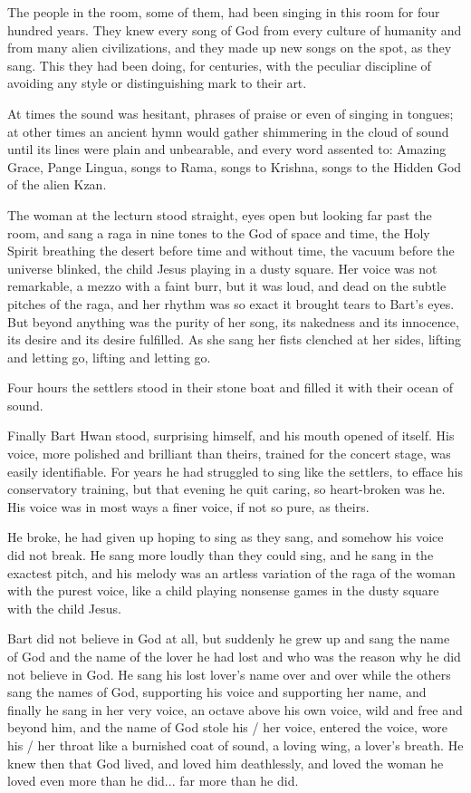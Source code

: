 \documentclass[english,11pt,letterpaper,onecolumn]{scrbook}
\begin{document}
	The people in the room, some of them, had been singing in this room for four hundred years. They knew every song of God from every culture of humanity and from many alien civilizations, and they made up new songs on the spot, as they sang. This they had been doing, for centuries, with the peculiar discipline of avoiding any style or distinguishing mark to their art. 

	At times the sound was hesitant, phrases of praise or even of singing in tongues; at other times an ancient hymn would gather shimmering in the cloud of sound until its lines were plain and unbearable, and every word assented to: Amazing Grace, Pange Lingua, songs to Rama, songs to Krishna, songs to the Hidden God of the alien Kzan. 

	The woman at the lecturn stood straight, eyes open but looking far past the room, and sang a raga in nine tones to the God of space and time, the Holy Spirit breathing the desert before time and without time, the vacuum before the universe blinked, the child Jesus playing in a dusty square.  Her voice was not remarkable, a mezzo with a faint burr, but it was loud, and dead on the subtle pitches of the raga, and her rhythm was so exact it brought tears to Bart's eyes.  But beyond anything was the purity of her song, its nakedness and its innocence, its desire and its desire fulfilled. As she sang her fists clenched at her sides, lifting and letting go, lifting and letting go.

	Four hours the settlers stood in their stone boat and filled it with their ocean of sound.

	Finally Bart Hwan stood, surprising himself, and his mouth opened of itself. His voice, more polished and brilliant than theirs, trained for the concert stage, was easily identifiable. For years he had struggled to sing like the settlers, to efface his conservatory training, but that evening he quit caring, so heart-broken was he. His voice was in most ways a finer voice, if not so pure, as theirs.

	He broke, he had given up hoping to sing as they sang, and somehow his voice did not break. He sang more loudly than they could sing, and he sang in the exactest pitch, and his melody was an artless variation of the raga of the woman with the purest voice, like a child playing nonsense games in the dusty square with the child Jesus. 

	Bart did not believe in God at all, but suddenly he grew up and sang the name of God and the name of the lover he had lost and who was the reason why he did not believe in God.  He sang his lost lover's name over and over while the others sang the names of God, supporting his voice and supporting her name, and finally he sang in her very voice, an octave above his own voice, wild and free and beyond him, and the name of God stole his / her voice, entered the voice, wore his / her throat like a burnished coat of sound, a loving wing, a lover's breath. He knew then that God lived, and loved him deathlessly, and loved the woman he loved even more than he did...  far more than he did.
\end{document}
